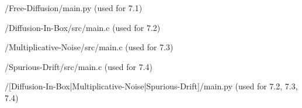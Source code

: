 \documentclass[a4paper, 12pt]{article}
\begin{document}

/Free-Diffusion/main.py (used for 7.1)

\newpage

/Diffusion-In-Box/src/main.c (used for 7.2)

\newpage

/Multiplicative-Noise/src/main.c (used for 7.3)

\newpage

/Spurious-Drift/src/main.c (used for 7.4)

\newpage

/[Diffusion-In-Box|Multiplicative-Noise|Spurious-Drift]/main.py (used for 7.2, 7.3, 7.4)

\newpage
\end{document}
